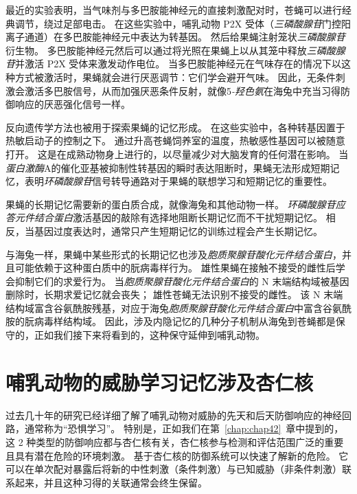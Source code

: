最近的实验表明，当气味剂与多巴胺能神经元的直接刺激配对时，苍蝇可以进行经典调节，绕过足部电击。
在这些实验中，哺乳动物 P2X 受体（\textit{三磷酸腺苷}门控阳离子通道）在多巴胺能神经元中表达为转基因。
然后给果蝇注射笼状\textit{三磷酸腺苷}衍生物。
多巴胺能神经元然后可以通过将光照在果蝇上以从其笼中释放\textit{三磷酸腺苷}并激活 P2X 受体来激发动作电位。
当多巴胺能神经元在气味存在的情况下以这种方式被激活时，果蝇就会进行厌恶调节：它们学会避开气味。
因此，无条件刺激会激活多巴胺信号，从而加强厌恶条件反射，就像5\textit{-羟色氨}在海兔中充当习得防御响应的厌恶强化信号一样。


反向遗传学方法也被用于探索果蝇的记忆形成。
在这些实验中，各种转基因置于热敏启动子的控制之下。
通过升高苍蝇饲养室的温度，热敏感性基因可以被随意打开。
这是在成熟动物身上进行的，以尽量减少对大脑发育的任何潜在影响。
当\textit{蛋白激酶}A的催化亚基被抑制性转基因的瞬时表达阻断时，果蝇无法形成短期记忆，表明\textit{环磷酸腺苷}信号转导通路对于果蝇的联想学习和短期记忆的重要性。


果蝇的长期记忆需要新的蛋白质合成，就像海兔和其他动物一样。
\textit{环磷酸腺苷应答元件结合蛋白}激活基因的敲除有选择地阻断长期记忆而不干扰短期记忆。
相反，当基因过度表达时，通常只产生短期记忆的训练过程会产生长期记忆。


与海兔一样，果蝇中某些形式的长期记忆也涉及\textit{胞质聚腺苷酸化元件结合蛋白}，并且可能依赖于这种蛋白质中的朊病毒样行为。
雄性果蝇在接触不接受的雌性后学会抑制它们的求爱行为。
当\textit{胞质聚腺苷酸化元件结合蛋白}的 N 末端结构域被基因删除时，长期求爱记忆就会丧失；
雄性苍蝇无法识别不接受的雌性。
该 N 末端结构域富含谷氨酰胺残基，对应于海兔\textit{胞质聚腺苷酸化元件结合蛋白}中富含谷氨酰胺的朊病毒样结构域。
因此，涉及内隐记忆的几种分子机制从海兔到苍蝇都是保守的，正如我们接下来将看到的，这种保守延伸到哺乳动物。



\section{哺乳动物的威胁学习记忆涉及杏仁核}

过去几十年的研究已经详细了解了哺乳动物对威胁的先天和后天防御响应的神经回路，通常称为“恐惧学习”。
特别是，正如我们在第~\ref{chap:chap42}~章中提到的，这 2 种类型的防御响应都与杏仁核有关，杏仁核参与检测和评估范围广泛的重要且具有潜在危险的环境刺激。
基于杏仁核的防御系统可以快速了解新的危险。
它可以在单次配对暴露后将新的中性刺激（条件刺激）与已知威胁（非条件刺激）联系起来，并且这种习得的关联通常会终生保留。


